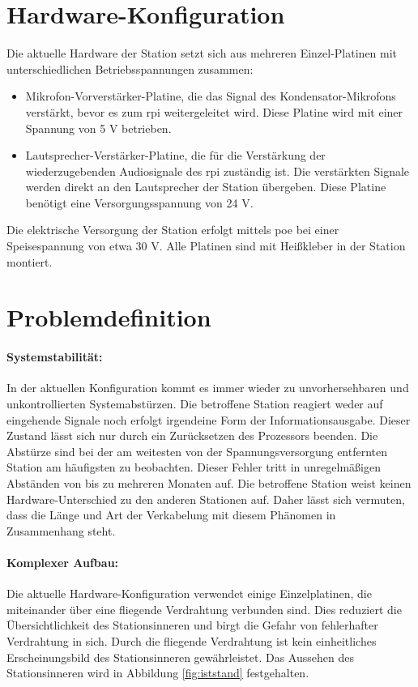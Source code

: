 \section{Hardware-Konfiguration}
Die aktuelle Hardware der Station setzt sich aus mehreren Einzel-Platinen mit unterschiedlichen Betriebsspannungen zusammen:
\begin{itemize}
    \item Mikrofon-Vorverstärker-Platine, die das Signal des Kondensator-Mikrofons verstärkt, bevor es zum \ac{rpi} weitergeleitet wird. Diese Platine wird mit einer Spannung von 5 V betrieben.
    \item Lautsprecher-Verstärker-Platine, die für die Verstärkung der wiederzugebenden Audiosignale des \ac{rpi} zuständig ist. Die verstärkten Signale werden direkt an den Lautsprecher der Station übergeben. Diese Platine benötigt eine Versorgungsspannung von 24 V.
\end{itemize}
Die elektrische Versorgung der Station erfolgt mittels \ac{poe} bei einer Speisespannung von etwa 30 V.
Alle Platinen sind mit Heißkleber in der Station montiert.

\section{Problemdefinition}
\paragraph{Systemstabilität:} %
In der aktuellen Konfiguration kommt es immer wieder zu unvorhersehbaren und unkontrollierten Systemabstürzen.
Die betroffene Station reagiert weder auf eingehende Signale noch erfolgt irgendeine Form der Informationsausgabe.
Dieser Zustand lässt sich nur durch ein Zurücksetzen des Prozessors beenden.
Die Abstürze sind bei der am weitesten von der Spannungsversorgung entfernten Station am häufigsten zu beobachten.
Dieser Fehler tritt in unregelmäßigen Abständen von bis zu mehreren Monaten auf.
Die betroffene Station weist keinen Hardware-Unterschied zu den anderen Stationen auf.
Daher lässt sich vermuten, dass die Länge und Art der Verkabelung mit diesem Phänomen in Zusammenhang steht.

\paragraph{Komplexer Aufbau:} %
Die aktuelle Hardware-Konfiguration verwendet einige Einzelplatinen, die miteinander über eine fliegende Verdrahtung verbunden sind.
Dies reduziert die Übersichtlichkeit des Stationsinneren und birgt die Gefahr von fehlerhafter Verdrahtung in sich.
Durch die fliegende Verdrahtung ist kein einheitliches Erscheinungsbild des Stationsinneren gewährleistet.
Das Aussehen des Stationsinneren wird in Abbildung \ref{fig:iststand} festgehalten.

